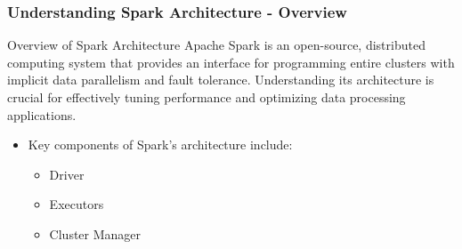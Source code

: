\documentclass[aspectratio=169]{beamer}
\begin{document}
\begin{frame}[fragile]
    \frametitle{Understanding Spark Architecture - Overview}
    \begin{block}{Overview of Spark Architecture}
        Apache Spark is an open-source, distributed computing system that provides an interface for programming entire clusters with implicit data parallelism and fault tolerance. Understanding its architecture is crucial for effectively tuning performance and optimizing data processing applications.
    \end{block}
    \begin{itemize}
        \item Key components of Spark's architecture include:
        \begin{itemize}
            \item Driver
            \item Executors
            \item Cluster Manager
        \end{itemize}
    \end{itemize}
\end{frame}
\end{document}
